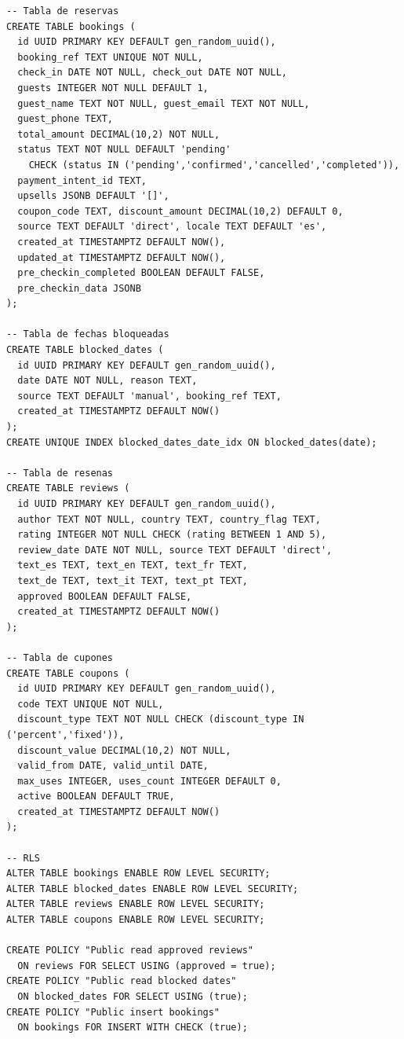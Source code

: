 \documentclass[12pt,a4paper,twoside,openright]{report}
\begin{document}
\begin{lstlisting}[style=sqlStyle]
-- Tabla de reservas
CREATE TABLE bookings (
  id UUID PRIMARY KEY DEFAULT gen_random_uuid(),
  booking_ref TEXT UNIQUE NOT NULL,
  check_in DATE NOT NULL, check_out DATE NOT NULL,
  guests INTEGER NOT NULL DEFAULT 1,
  guest_name TEXT NOT NULL, guest_email TEXT NOT NULL,
  guest_phone TEXT,
  total_amount DECIMAL(10,2) NOT NULL,
  status TEXT NOT NULL DEFAULT 'pending'
    CHECK (status IN ('pending','confirmed','cancelled','completed')),
  payment_intent_id TEXT,
  upsells JSONB DEFAULT '[]',
  coupon_code TEXT, discount_amount DECIMAL(10,2) DEFAULT 0,
  source TEXT DEFAULT 'direct', locale TEXT DEFAULT 'es',
  created_at TIMESTAMPTZ DEFAULT NOW(),
  updated_at TIMESTAMPTZ DEFAULT NOW(),
  pre_checkin_completed BOOLEAN DEFAULT FALSE,
  pre_checkin_data JSONB
);

-- Tabla de fechas bloqueadas
CREATE TABLE blocked_dates (
  id UUID PRIMARY KEY DEFAULT gen_random_uuid(),
  date DATE NOT NULL, reason TEXT,
  source TEXT DEFAULT 'manual', booking_ref TEXT,
  created_at TIMESTAMPTZ DEFAULT NOW()
);
CREATE UNIQUE INDEX blocked_dates_date_idx ON blocked_dates(date);

-- Tabla de resenas
CREATE TABLE reviews (
  id UUID PRIMARY KEY DEFAULT gen_random_uuid(),
  author TEXT NOT NULL, country TEXT, country_flag TEXT,
  rating INTEGER NOT NULL CHECK (rating BETWEEN 1 AND 5),
  review_date DATE NOT NULL, source TEXT DEFAULT 'direct',
  text_es TEXT, text_en TEXT, text_fr TEXT,
  text_de TEXT, text_it TEXT, text_pt TEXT,
  approved BOOLEAN DEFAULT FALSE,
  created_at TIMESTAMPTZ DEFAULT NOW()
);

-- Tabla de cupones
CREATE TABLE coupons (
  id UUID PRIMARY KEY DEFAULT gen_random_uuid(),
  code TEXT UNIQUE NOT NULL,
  discount_type TEXT NOT NULL CHECK (discount_type IN ('percent','fixed')),
  discount_value DECIMAL(10,2) NOT NULL,
  valid_from DATE, valid_until DATE,
  max_uses INTEGER, uses_count INTEGER DEFAULT 0,
  active BOOLEAN DEFAULT TRUE,
  created_at TIMESTAMPTZ DEFAULT NOW()
);

-- RLS
ALTER TABLE bookings ENABLE ROW LEVEL SECURITY;
ALTER TABLE blocked_dates ENABLE ROW LEVEL SECURITY;
ALTER TABLE reviews ENABLE ROW LEVEL SECURITY;
ALTER TABLE coupons ENABLE ROW LEVEL SECURITY;

CREATE POLICY "Public read approved reviews"
  ON reviews FOR SELECT USING (approved = true);
CREATE POLICY "Public read blocked dates"
  ON blocked_dates FOR SELECT USING (true);
CREATE POLICY "Public insert bookings"
  ON bookings FOR INSERT WITH CHECK (true);
\end{lstlisting}

\clearpage
\listoftables
\clearpage
\listoffigures

\end{document}
